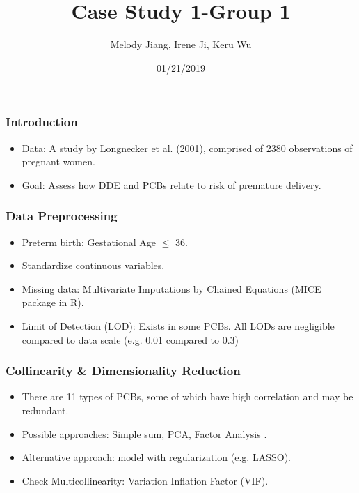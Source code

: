 \documentclass{beamer}
\title{Case Study 1-Group 1}
\author{Melody Jiang, Irene Ji, Keru Wu}
\institute{Department of Statistical Science, Duke University}
\date{01/21/2019}
\begin{document}
\frame{\titlepage}





\begin{frame}
\frametitle{Introduction}

\begin{itemize}
\item Data: A study by Longnecker et al. (2001), comprised of 2380 observations of pregnant women.
  
\item Goal: Assess how DDE and PCBs relate to risk of premature delivery.

\end{itemize}

\end{frame}







\begin{frame}
\frametitle{Data Preprocessing}
\begin{itemize}

\item Preterm birth: Gestational Age $\leq$ 36.
\item Standardize continuous variables.
\item Missing data: Multivariate Imputations by Chained Equations (MICE package in R). 
\item Limit of Detection (LOD): Exists in some PCBs. All LODs are negligible compared to data scale (e.g. 0.01 compared to 0.3)

\end{itemize}
\end{frame}




\begin{frame}
\frametitle{Collinearity \& Dimensionality Reduction}

\begin{itemize}

\item There are 11 types of PCBs, some of which have high correlation and may be redundant.
\item Possible approaches: Simple sum, PCA, Factor Analysis .
\item Alternative approach: model with regularization (e.g. LASSO).
\item Check Multicollinearity: Variation Inflation Factor (VIF).

\end{itemize}
\end{frame}
\end{document}
